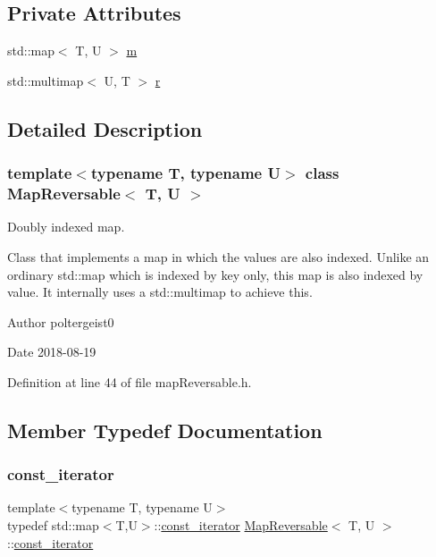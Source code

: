 \subsection*{Private Attributes}
\begin{DoxyCompactItemize}
\item 
std\+::map$<$ T, U $>$ \hyperlink{classMapReversable_afdf022d06bd77580fe8c0c4309114f83}{m}
\item 
std\+::multimap$<$ U, T $>$ \hyperlink{classMapReversable_a301493c801719dbfef40db1cdc7a5ebe}{r}
\end{DoxyCompactItemize}


\subsection{Detailed Description}
\subsubsection*{template$<$typename T, typename U$>$\newline
class Map\+Reversable$<$ T, U $>$}

Doubly indexed map. 

Class that implements a map in which the values are also indexed. Unlike an ordinary std\+::map which is indexed by key only, this map is also indexed by value. It internally uses a std\+::multimap to achieve this.

\begin{DoxyAuthor}{Author}
poltergeist0
\end{DoxyAuthor}
\begin{DoxyDate}{Date}
2018-\/08-\/19 
\end{DoxyDate}


Definition at line 44 of file map\+Reversable.\+h.



\subsection{Member Typedef Documentation}
\mbox{\label{classMapReversable_a7a41e7d60ba284a59e7bf76c8c53e9c2}} 
\subsubsection{\texorpdfstring{const\+\_\+iterator}{const\_iterator}}
{\footnotesize\ttfamily template$<$typename T, typename U$>$ \\
typedef std\+::map$<$T,U$>$\+::\hyperlink{classMapReversable_a7a41e7d60ba284a59e7bf76c8c53e9c2}{const\+\_\+iterator} \hyperlink{classMapReversable}{Map\+Reversable}$<$ T, U $>$\+::\hyperlink{classMapReversable_a7a41e7d60ba284a59e7bf76c8c53e9c2}{const\+\_\+iterator}}



